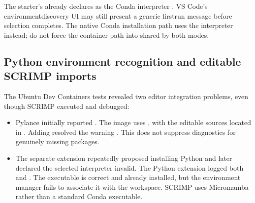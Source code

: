 \documentclass[letterpaper,10pt,english]{sphinxmanual}
\begin{document}
\sphinxAtStartPar
The starter’s  already declares
 as the Conda interpreter
. VS Code’s environment\sphinxhyphen{}discovery UI may
still present a generic first\sphinxhyphen{}run message before selection
completes. The native Conda installation path uses the
 interpreter instead; do not force the container
path into  shared by both modes.


\subsection{Python environment recognition and editable SCRIMP imports}
\label{\detokenize{vscode:python-environment-recognition-and-editable-scrimp-imports}}
\sphinxAtStartPar
The Ubuntu Dev Containers tests revealed two  editor
integration problems, even though SCRIMP executed and debugged:
\begin{itemize}
\item {} 
\sphinxAtStartPar
Pylance initially reported . The image uses , with the
editable sources located in .
Adding 
resolved the warning . This does
not suppress diagnostics for genuinely missing packages.

\item {} 
\sphinxAtStartPar
The separate  extension repeatedly
proposed installing Python and later declared the selected
interpreter invalid.  The Python extension
logged both  and
.
The executable is correct and already installed, but the
environment manager fails to associate it with the workspace.
SCRIMP uses Micromamba rather than a standard Conda executable.

\end{itemize}
\end{document}
